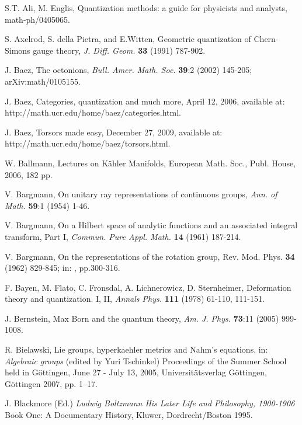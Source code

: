 \documentclass[12pt]{article}
\begin{document}
\begin{thebibliography}{000}

 S.T. Ali, M. Englis, Quantization methods: a guide for
physicists and analysts, math-ph/0405065.

 S. Axelrod, S. della Pietra, and E.Witten, Geometric
quantization of Chern-Simons gauge theory, {\it J. Diff. Geom.} {\bf 33} (1991)
787-902.

 J. Baez, The octonions, {\it Bull. Amer. Math. Soc.} 
{\bf 39}:2 (2002) 145-205; arXiv:math/0105155.

 J. Baez, Categories, quantization and much more, April 12,
2006, available at: http://math.ucr.edu/home/baez/categories.html.

 J. Baez, Torsors made easy, December 27, 2009,
available at: http://math.ucr.edu/home/baez/torsors.html.

 W. Ballmann, {Lectures on K\"ahler Manifolds}, European Math.
Soc., Publ. House, 2006, 182 pp.

 V. Bargmann, On unitary ray representations of continuous
groups, {\it Ann. of Math.} {\bf 59}:1 (1954) 1-46.

 V. Bargmann, On a Hilbert space of analytic functions and an
associated integral transform, Part I, {\it Commun. Pure Appl. Math.} {\bf 14} 
(1961) 187-214.

 V. Bargmann, On the representations of the rotation group,
Rev. Mod. Phys. {\bf34} (1962) 829-845; in: \cite{QTAM}, pp.300-316.

 F. Bayen, M. Flato, C. Fronsdal, A. Lichnerowicz, D. Sternheimer,
Deformation theory and quantization. I, II,
{\it Annals Phys.} {\bf 111} (1978) 61-110, 111-151.

 J. Bernstein, Max Born and the quantum theory, {\it Am. J. 
Phys.} {\bf 73}:11 (2005) 999-1008.

 R. Bielawski, Lie groups, hyperkaehler metrics and Nahm's equations, in: 
{\it Algebraic groups} (edited by Yuri Tschinkel) Proceedings of the Summer School held in 
G\"ottingen, June 27 - July 13, 2005, Universit\"atsverlag G\"ottingen, G\"ottingen 2007, pp. 1--17. 

 J. Blackmore (Ed.) {\it Ludwig Boltzmann His Later Life and Philosophy, 1900-1906} 
Book One: A Documentary History, Kluwer, Dordrecht/Boston 1995.


\end{thebibliography}
\end{document}
